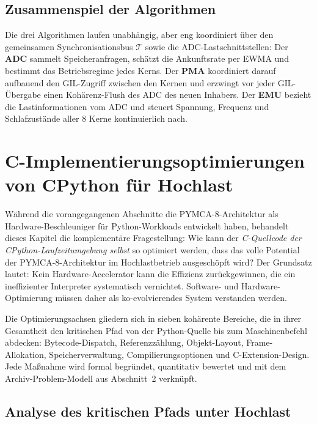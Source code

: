 ﻿\documentclass[a4paper,12pt]{scrreprt}
\theoremstyle{definition}
\begin{document}
	\subsection{Zusammenspiel der Algorithmen}

	Die drei Algorithmen laufen unabhängig, aber eng koordiniert über den gemeinsamen
	Synchronisationsbus $\mathcal{T}$ sowie die ADC-Lastschnittstellen:
	Der \textbf{ADC} sammelt Speicheranfragen, schätzt die Ankunftsrate per EWMA und bestimmt
	das Betriebsregime jedes Kerns.
	Der \textbf{PMA} koordiniert darauf aufbauend den GIL-Zugriff zwischen den Kernen und
	erzwingt vor jeder GIL-Übergabe einen Kohärenz-Flush des ADC des neuen Inhabers.
	Der \textbf{EMU} bezieht die Lastinformationen vom ADC und steuert Spannung, Frequenz
	und Schlafzustände aller 8 Kerne kontinuierlich nach.

	\section{C-Implementierungsoptimierungen von CPython für Hochlast}
	\label{sec:coptimization}
	
	Während die vorangegangenen Abschnitte die PYMCA-8-Architektur als
	Hardware-Beschleuniger für Python-Workloads entwickelt haben, behandelt
	dieses Kapitel die komplementäre Fragestellung: Wie kann der
	\emph{C-Quellcode der CPython-Laufzeitumgebung selbst} so optimiert
	werden, dass das volle Potential der PYMCA-8-Architektur im Hochlastbetrieb
	ausgeschöpft wird? Der Grundsatz lautet: Kein Hardware-Accelerator kann
	die Effizienz zurückgewinnen, die ein ineffizienter Interpreter
	systematisch vernichtet. Software- und Hardware-Optimierung müssen daher
	als ko-evolvierendes System verstanden werden.
	
	Die Optimierungsachsen gliedern sich in sieben kohärente Bereiche,
	die in ihrer Gesamtheit den kritischen Pfad von der Python-Quelle bis
	zum Maschinenbefehl abdecken: Bytecode-Dispatch, Referenzzählung,
	Objekt-Layout, Frame-Allokation, Speicherverwaltung, Compilierungsoptionen
	und C-Extension-Design. Jede Maßnahme wird formal begründet, quantitativ
	bewertet und mit dem Archiv-Problem-Modell aus Abschnitt~2 verknüpft.
	
	\subsection{Analyse des kritischen Pfads unter Hochlast}
	
\end{document}
